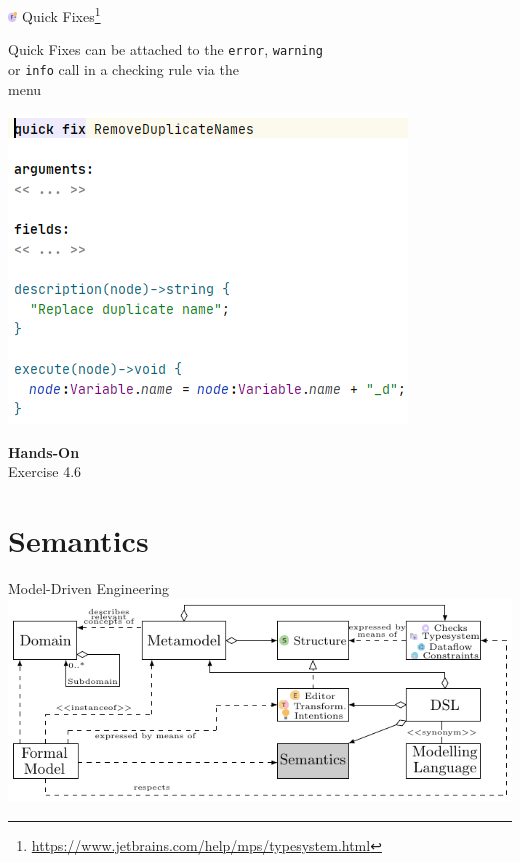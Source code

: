	\begin{frame}{\includegraphics[height=0.25cm]{graphics/quickfix.png} Quick Fixes\footnote{\url{https://www.jetbrains.com/help/mps/typesystem.html}}}
		\begin{minipage}{0.52\textwidth}
			Quick Fixes can be attached to the \texttt{error}, \texttt{warning}\\
			or \texttt{info} call in a checking rule via the \\
			\menu{\workshopinspector{}} menu
		\end{minipage}
		\begin{minipage}{0.4\textwidth}
			\includegraphics[height=0.8\textheight]{illustrations/quickfix.png}
		\end{minipage}
	\end{frame}

	\begin{frame}
		\begin{center}
			\Huge \textbf{Hands-On}\\
			
			Exercise 4.6
		\end{center}
	\end{frame}

	\section{Semantics}
	
	\begin{frame}{Model-Driven Engineering}
		\includegraphics[width=\textwidth]{tikz/mdsd_concept_7.pdf}
	\end{frame}
	
